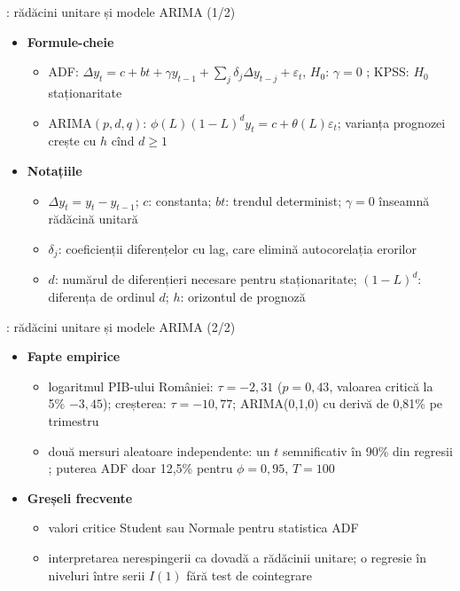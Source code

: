 \begin{frame}{: rădăcini unitare și modele ARIMA (1/2)}
\itemsize{\footnotesize}
\begin{itemize}
    \item \textbf{Formule-cheie}
    \begin{itemize}
        \item ADF: $\Delta y_t = c + bt + \gamma y_{t-1} + \sum_j\delta_j\Delta y_{t-j} + \varepsilon_t$, $H_0$: $\gamma = 0$ ; KPSS: $H_0$ staționaritate 
        \item ARIMA$(p,d,q)$: $\phi(L)(1 - L)^d y_t = c + \theta(L)\varepsilon_t$; varianța prognozei crește cu $h$ cînd $d \ge 1$
    \end{itemize}
    \item \textbf{Notațiile}
    \begin{itemize}
        \item $\Delta y_t = y_t - y_{t-1}$; $c$: constanta; $bt$: trendul determinist; $\gamma = 0$ înseamnă rădăcină unitară
        \item $\delta_j$: coeficienții diferențelor cu lag, care elimină autocorelația erorilor
        \item $d$: numărul de diferențieri necesare pentru staționaritate; $(1 - L)^d$: diferența de ordinul $d$; $h$: orizontul de prognoză
    \end{itemize}
\end{itemize}
\end{frame}

\begin{frame}{: rădăcini unitare și modele ARIMA (2/2)}
\itemsize{\footnotesize}
\begin{itemize}
    \item \textbf{Fapte empirice}
    \begin{itemize}
        \item logaritmul PIB-ului României: $\tau = \ensuremath{-}2{,}31$ ($p = 0{,}43$, valoarea critică la 5\% $\ensuremath{-}3{,}45$); creșterea: $\tau = \ensuremath{-}10{,}77$; ARIMA(0,1,0) cu derivă de 0{,}81\% pe trimestru
        \item două mersuri aleatoare independente: un $t$ semnificativ în 90\% din regresii ; puterea ADF doar 12{,}5\% pentru $\phi = 0{,}95$, $T = 100$
    \end{itemize}
    \item \textbf{Greșeli frecvente}
    \begin{itemize}
        \item valori critice Student sau Normale pentru statistica ADF
        \item interpretarea nerespingerii ca dovadă a rădăcinii unitare; o regresie în niveluri între serii $I(1)$ fără test de cointegrare
    \end{itemize}
\end{itemize}
\end{frame}


